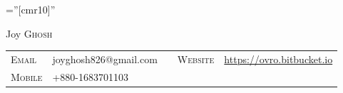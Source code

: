 \documentclass[a4paper,10pt]{article}
\begin{document}

\pagestyle{empty} %

\font\fb=''[cmr10]'' %

\par{\centering
    {\Huge Joy \textsc{Ghosh}
  }\bigskip\par}

\begin{comment}
\begin{tabular}{rl}
    \textsc{Mobile}     & +880-1683701103\\
\end{tabular}
\end{comment}

\begin{tabular}{p{1cm}p{4cm}p{1cm}p{1.2cm}p{3cm}}
     \textsc{Email} & joyghosh826@gmail.com
     & & 
     \textsc{Website} & \href{https://ovro.bitbucket.io/}{https://ovro.bitbucket.io} \\
     \textsc{Mobile} & +880-1683701103 & & &
\end{tabular}

\end{document}
